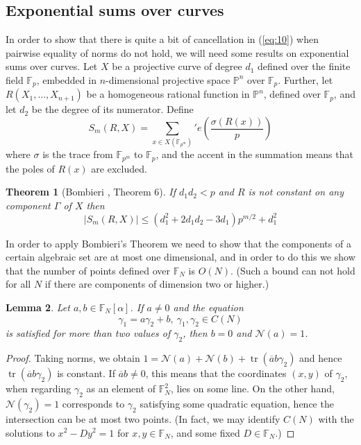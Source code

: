 \documentclass[12pt]{amsart}
\newtheorem{thm}{Theorem}%
\newtheorem{lem}[thm]{Lemma}%
\theoremstyle{plain}
\newcommand{\trace}{\operatorname{tr}}
\newcommand{\unit}{\alpha}
\newcommand{\mnorm}{ {\mathcal N}} %
\newcommand{\rmk}[1]{\footnote{{\bf Comment:} #1}}
\newcommand{\torus}{C(N)} %
\renewcommand{\^}{\widehat}
\begin{document}
\subsection{Exponential sums over curves}
\label{sec:nontrivial-exponential-sums}
In order to show that there is quite a bit of cancellation in 
(\ref{eq:10}) when pairwise
equality of norms do not hold, we will need some results on
exponential sums over curves.
%
Let $X$ be a projective curve of degree $d_1$ defined over the finite
field $\mathbb{F}_p$, embedded in $n$-dimensional projective space
$\mathbb{P}^n$ over 
$\mathbb{F}_p$.  Further, let $R(X_1, \ldots, X_{n+1})$ be a
homogeneous rational 
function in $\mathbb{P}^n$, defined over $\mathbb{F}_p$, and let $d_2$
be the degree of 
its numerator.  Define 
$$
S_m(R,X) = \sum_{x \in X(\mathbb{F}_{p^m})}' e\left( \frac{\sigma(R(x))}{p} 
\right)
$$
%
where $\sigma$ is the trace from $\mathbb{F}_{p^m}$ to $\mathbb{F}_p$, and  the
accent in the summation means that the poles of $R(x)$ are excluded.
%
\begin{thm}[Bombieri \cite{bombieri-exp-sum}, Theorem 6]
If $d_1d_2<p$ and $R$ is not constant on any component $\Gamma$ of
$X$ then 
$$
|S_m(R,X)|
\leq
(d_1^2+ 2d_1d_2 - 3d_1) p^{m/2} + d_1^2
$$
\end{thm}
In order to apply Bombieri's Theorem we need to show that the
components of a certain algebraic set are at most one
dimensional,
%
and in order to do this we show that the number of points defined over
$\mathbb{F}_N$ is $O(N)$. %
(Such a bound can not hold for all $N$ if there are
components of dimension two or higher.)
\begin{lem}
\label{l:two-circles}Let $a,b \in \mathbb{F}_N[\unit]$. 
If $a \neq 0$ and the equation 
$$
\gamma_1 = a \gamma_2 + b, \ \gamma_1,\gamma_2 \in \torus
$$
is satisfied for more than two values of $\gamma_2$, then $b =0 $ and
$\mnorm(a) = 1$.  
\end{lem}
\begin{proof}
Taking norms, we obtain $1 = \mnorm(a) + \mnorm(b) +
\trace(\overline{a} b\gamma_2)$ and 
hence $\trace(\overline{a} b\gamma_2)$ is constant.   If $\overline{a}
b \neq 0$, this  means that the coordinates $(x,y)$ of $\gamma_2$, when
regarding $\gamma_2$ as an element of $\mathbb{F}_N^2$, lies on some
line.  On the 
other hand, $\mnorm(\gamma_2)=1$ corresponds to $\gamma_2$ satisfying some
quadratic equation, hence the intersection can be  at most two points.
(In fact, we may identify $\torus$ with the solutions to
$x^2 -D y^2 = 1$ for $x,y \in \mathbb{F}_N$, and some fixed $D \in
\mathbb{F}_N$.) 
\end{proof}
\end{document}
